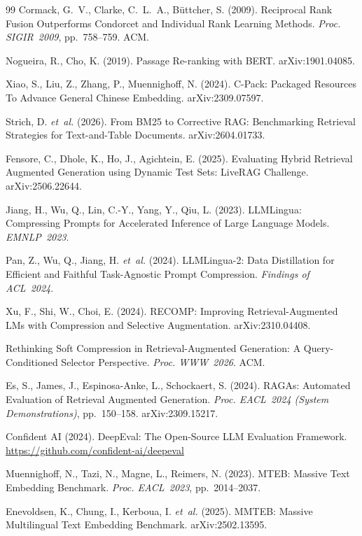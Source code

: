 \documentclass[11pt,a4paper]{article}
\begin{document}
\begin{thebibliography}{99}
Cormack, G.~V., Clarke, C.~L.~A., Büttcher, S. (2009).
Reciprocal Rank Fusion Outperforms Condorcet and Individual Rank Learning Methods.
\textit{Proc. SIGIR~2009}, pp.~758--759. ACM.

Nogueira, R., Cho, K. (2019).
Passage Re-ranking with BERT.
arXiv:1901.04085.

Xiao, S., Liu, Z., Zhang, P., Muennighoff, N. (2024).
C-Pack: Packaged Resources To Advance General Chinese Embedding.
arXiv:2309.07597.

Strich, D. \textit{et~al.} (2026).
From BM25 to Corrective RAG: Benchmarking Retrieval Strategies for Text-and-Table Documents.
arXiv:2604.01733.

Fensore, C., Dhole, K., Ho, J., Agichtein, E. (2025).
Evaluating Hybrid Retrieval Augmented Generation using Dynamic Test Sets: LiveRAG Challenge.
arXiv:2506.22644.

Jiang, H., Wu, Q., Lin, C.-Y., Yang, Y., Qiu, L. (2023).
LLMLingua: Compressing Prompts for Accelerated Inference of Large Language Models.
\textit{EMNLP~2023}.

Pan, Z., Wu, Q., Jiang, H. \textit{et~al.} (2024).
LLMLingua-2: Data Distillation for Efficient and Faithful Task-Agnostic Prompt Compression.
\textit{Findings of ACL~2024}.

Xu, F., Shi, W., Choi, E. (2024).
RECOMP: Improving Retrieval-Augmented LMs with Compression and Selective Augmentation.
arXiv:2310.04408.

Rethinking Soft Compression in Retrieval-Augmented Generation: A Query-Conditioned Selector Perspective.
\textit{Proc. WWW~2026}. ACM.

Es, S., James, J., Espinosa-Anke, L., Schockaert, S. (2024).
RAGAs: Automated Evaluation of Retrieval Augmented Generation.
\textit{Proc. EACL~2024 (System Demonstrations)}, pp.~150--158. arXiv:2309.15217.

Confident AI (2024).
DeepEval: The Open-Source LLM Evaluation Framework.
\url{https://github.com/confident-ai/deepeval}

Muennighoff, N., Tazi, N., Magne, L., Reimers, N. (2023).
MTEB: Massive Text Embedding Benchmark.
\textit{Proc. EACL~2023}, pp.~2014--2037.

Enevoldsen, K., Chung, I., Kerboua, I. \textit{et~al.} (2025).
MMTEB: Massive Multilingual Text Embedding Benchmark.
arXiv:2502.13595.


\end{thebibliography}
\end{document}
